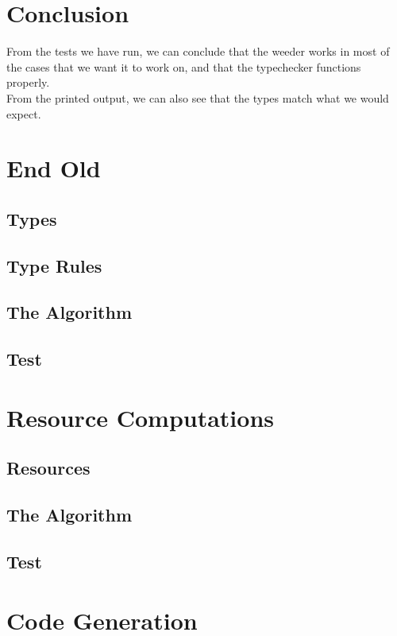 \documentclass[a4paper,10pt,titlepage]{report}
\begin{document}
\section{Conclusion}
From the tests we have run, we can conclude that the weeder works in most of the cases that we want it to work on, and that the typechecker functions properly.\\
From the printed output, we can also see that the types match what we would expect.


\section{End Old}

\subsection{Types}

\subsection{Type Rules}

\subsection{The Algorithm}

\subsection{Test}

\section{Resource Computations}

\subsection{Resources}

\subsection{The Algorithm}

\subsection{Test}

\section{Code Generation}
\end{document}
